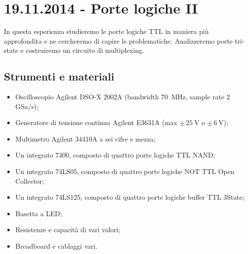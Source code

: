 \section{19.11.2014 - Porte logiche II}

In questa esperienza studieremo le porte logiche TTL in maniera più approfondita e ne cercheremo di capire le problematiche. Analizzeremo porte tri-state e costruiremo un circuito di multiplexing.

\subsection*{Strumenti e materiali}

\begin{itemize} [noitemsep]
	\item Oscilloscopio Agilent DSO-X 2002A (bandwidth \SI{70}{\mega\hertz}, sample rate \num{2} GSa/s);
	\item Generatore di tensione continua Agilent E3631A (max $\pm \, \SI{25}{\volt}$ o $\pm \, \SI{6}{\volt}$);
	\item Multimetro Agilent 34410A a sei cifre e mezza;
	\item Un integrato 7400, composto di quattro porte logiche TTL NAND; %
	\item Un integrato 74LS05, composto di quattro porte logiche NOT TTL Open Collector;
	\item Un integrato 74LS125, composto di quattro porte logiche buffer TTL 3State;
	\item Basetta a LED;		
	\item Resistenze e capacità di vari valori;
	\item Breadboard e cablaggi vari.
\end{itemize}
